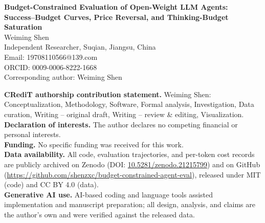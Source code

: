 \documentclass[12pt]{article}
\begin{document}
\thispagestyle{empty}
\begin{center}
{\Large\bfseries Budget-Constrained Evaluation of Open-Weight LLM Agents:\\ Success--Budget Curves, Price Reversal, and Thinking-Budget Saturation}\\[2em]
{\large Weiming Shen}\\[0.5em]
Independent Researcher, Suqian, Jiangsu, China\\[0.3em]
Email: 19708110566@139.com\\[0.3em]
ORCID: 0009-0006-8222-1668\\[0.3em]
Corresponding author: Weiming Shen
\end{center}
\vspace{2em}
\noindent\textbf{CRediT authorship contribution statement.} Weiming Shen: Conceptualization, Methodology, Software, Formal analysis, Investigation, Data curation, Writing -- original draft, Writing -- review \& editing, Visualization.\\[1em]
\noindent\textbf{Declaration of interests.} The author declares no competing financial or personal interests.\\[1em]
\noindent\textbf{Funding.} No specific funding was received for this work.\\[1em]
\noindent\textbf{Data availability.} All code, evaluation trajectories, and per-token cost records are publicly archived on Zenodo (DOI: \href{https://doi.org/10.5281/zenodo.21215799}{10.5281/zenodo.21215799}) and on GitHub (\url{https://github.com/shenzxc/budget-constrained-agent-eval}), released under MIT (code) and CC BY 4.0 (data).\\[1em]
\noindent\textbf{Generative AI use.} AI-based coding and language tools assisted implementation and manuscript preparation; all design, analysis, and claims are the author's own and were verified against the released data.
\end{document}
